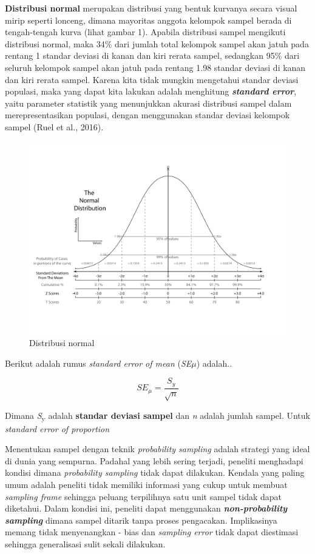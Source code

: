 \documentclass[
  english,
  man]{apa6}
\begin{document}
\textbf{Distribusi normal} merupakan distribusi yang bentuk kurvanya secara visual mirip seperti lonceng, dimana mayoritas anggota kelompok sampel berada di tengah-tengah kurva (lihat gambar 1). Apabila distribusi sampel mengikuti distribusi normal, maka 34\% dari jumlah total kelompok sampel akan jatuh pada rentang 1 standar deviasi di kanan dan kiri rerata sampel, sedangkan 95\% dari seluruh kelompok sampel akan jatuh pada rentang 1.98 standar deviasi di kanan dan kiri rerata sampel. Karena kita tidak mungkin mengetahui standar deviasi populasi, maka yang dapat kita lakukan adalah menghitung \textbf{\emph{standard error}}, yaitu parameter statistik yang menunjukkan akurasi distribusi sampel dalam merepresentasikan populasi, dengan menggunakan standar deviasi kelompok sampel (Ruel et al., 2016).

\begin{figure}

{\centering \includegraphics[width=9.48in]{images/normal-dist} 

}

\caption{Distribusi normal}\label{fig:unnamed-chunk-1}
\end{figure}

Berikut adalah rumus \emph{standard error of mean} (\emph{SE}\(\mu\)) adalah..

\[
SE_\mu = \frac{S_y}{\sqrt{n}}
\]

Dimana \emph{S}\textsubscript{y} adalah \textbf{standar deviasi sampel} dan \emph{n} adalah jumlah sampel. Untuk \emph{standard error of proportion}

Menentukan sampel dengan teknik \emph{probability sampling} adalah strategi yang ideal di dunia yang sempurna. Padahal yang lebih sering terjadi, peneliti menghadapi kondisi dimana \emph{probability sampling} tidak dapat dilakukan. Kendala yang paling umum adalah peneliti tidak memiliki informasi yang cukup untuk membuat \emph{sampling frame} sehingga peluang terpilihnya satu unit sampel tidak dapat diketahui. Dalam kondisi ini, peneliti dapat menggunakan \textbf{\emph{non-probability sampling}} dimana sampel ditarik tanpa proses pengacakan. Implikasinya memang tidak menyenangkan - bias dan \emph{sampling error} tidak dapat diestimasi sehingga generalisasi sulit sekali dilakukan.
\end{document}
